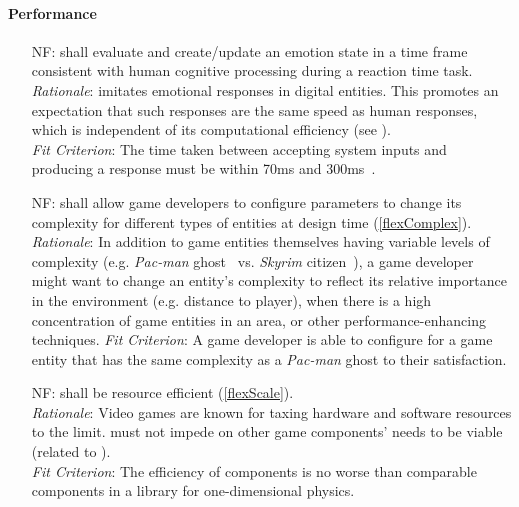 \paragraph{Performance}
\noindent \begin{itemize}[wide=0pt, leftmargin=*]

    \item[NF\refstepcounter{nfnum}\thenfnum \label{N_Speed}:] \progname{} shall
    evaluate and create/update an emotion state in a time frame consistent with
    human cognitive processing during a reaction time task. \vspace*{1mm}\\
    \textit{Rationale}: \progname{} imitates emotional responses in digital
    entities. This promotes an expectation that such responses are the same
    speed as human responses, which is independent of its computational
    efficiency (see ). \vspace*{1mm}\\
    \textit{Fit Criterion}: The time taken between accepting system inputs and
    producing a response must be within 70ms and
    300ms~\citep[p.~47]{mackenzie2012human}.

    \item[NF\refstepcounter{nfnum}\thenfnum \label{N_Complex}:] \progname{}
    shall allow game developers to configure parameters to change its
    complexity for different types of entities at design time
    (\ref{flexComplex}). \vspace*{1mm}\\
    \textit{Rationale}: In addition to game entities themselves having variable
    levels of complexity (e.g. \textit{Pac-man} ghost~\citep{pacman} vs.
    \textit{Skyrim} citizen~\citep{skyrim}), a game developer might want to
    change an entity's complexity to reflect its relative importance in the
    environment (e.g. distance to player), when there is a high concentration
    of game entities in an area, or other performance-enhancing techniques.
    \vspace*{1mm}\linebreak
    \textit{Fit Criterion}: A game developer is able to configure \progname{}
    for a game entity that has the same complexity as a \textit{Pac-man} ghost
    to their satisfaction.

    \item[NF\refstepcounter{nfnum}\thenfnum \label{N_Efficient}:] \progname{}
    shall be resource efficient (\ref{flexScale}). \vspace*{1mm}\\
    \textit{Rationale}: Video games are known for taxing hardware and software
    resources to the limit. \progname{} must not impede on other game
    components' needs to be viable (related to ).
    \vspace*{1mm}\\
    \textit{Fit Criterion}: The efficiency of \progname{} components is no
    worse than comparable components in a library for one-dimensional physics.

\end{itemize}


